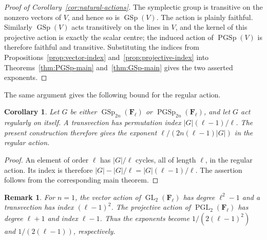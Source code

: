 \documentclass[11pt,hidelinks]{amsart}
\newtheorem{corollary}[theorem]{Corollary}
\newtheorem{remark}[theorem]{Remark}
\newcommand{\F}{\mathbf F}
\newcommand{\GL}{\operatorname{GL}}
\newcommand{\PGL}{\operatorname{PGL}}
\newcommand{\GSp}{\operatorname{GSp}}
\newcommand{\PGSp}{\operatorname{PGSp}}
\begin{document}
\begin{proof}[Proof of Corollary~\ref{cor:natural-actions}]
The symplectic group is transitive on the nonzero vectors of $V$, and hence so is $\GSp(V)$. The action is plainly faithful. Similarly $\GSp(V)$ acts transitively on the lines in $V$, and the kernel of this projective action is exactly the scalar centre; the induced action of $\PGSp(V)$ is therefore faithful and transitive. Substituting the indices from Propositions~\ref{prop:vector-index} and~\ref{prop:projective-index} into Theorems~\ref{thm:PGSp-main} and~\ref{thm:GSp-main} gives the two asserted exponents.
\end{proof}

The same argument gives the following bound for the regular action.

\begin{corollary}\label{cor:regular}
Let $G$ be either $\GSp_{2n}(\F_\ell)$ or $\PGSp_{2n}(\F_\ell)$, and let $G$ act regularly on itself. A transvection has permutation index $|G|(\ell-1)/\ell$. The present construction therefore gives the exponent $\ell/(2n(\ell-1)|G|)$ in the regular action.
\end{corollary}

\begin{proof}
An element of order $\ell$ has $|G|/\ell$ cycles, all of length $\ell$, in the regular action. Its index is therefore $|G|-|G|/\ell=|G|(\ell-1)/\ell$. The assertion follows from the corresponding main theorem.
\end{proof}

\begin{remark}\label{rem:n1}
For $n=1$, the vector action of $\GL_2(\F_\ell)$ has degree $\ell^2-1$ and a transvection has index $(\ell-1)^2$. The projective action of $\PGL_2(\F_\ell)$ has degree $\ell+1$ and index $\ell-1$. Thus the exponents become $1/(2(\ell-1)^2)$ and $1/(2(\ell-1))$, respectively.
\end{remark}


\printbibliography
\end{document}
